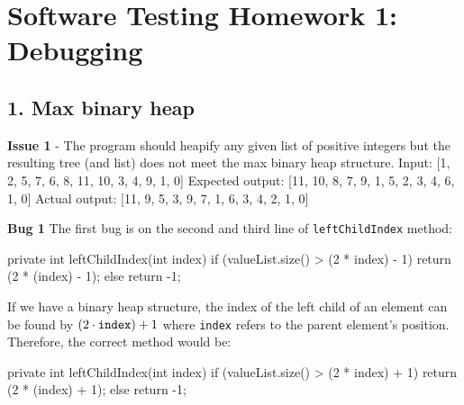 \documentclass[11pt]{article}
\begin{document}
\pagestyle{fancy}

\section*{Software Testing Homework 1: Debugging}

\subsection*{1. Max binary heap}
\newline
\textbf{Issue 1} - The program should heapify any given list of positive integers but the resulting tree (and list) does not meet the max binary heap structure.
\newline
Input: [1, 2, 5, 7, 6, 8, 11, 10, 3, 4, 9, 1, 0]
\newline
Expected output: [11, 10, 8, 7, 9, 1, 5, 2, 3, 4, 6, 1, 0]
\newline
Actual output: [11, 9, 5, 3, 9, 7, 1, 6, 3, 4, 2, 1, 0]

\hfill\begin{minipage}{\dimexpr\textwidth-0.5cm}
\textbf{Bug 1}
\newline
The first bug is on the second and third line of \verb/leftChildIndex/ method:
\begin{javacode}
    private int leftChildIndex(int index) {
        if (valueList.size() > (2 * index) - 1) {
            return (2 * (index) - 1);
        } else return -1;
    }
\end{javacode}
If we have a binary heap structure, the index of the left child of an element can be found by $(2 \cdot \verb/index/) + 1$ where \verb/index/ refers to the parent element's position. Therefore, the correct method would be:
\begin{javacode}
    private int leftChildIndex(int index) {
        if (valueList.size() > (2 * index) + 1) {
            return (2 * (index) + 1);
        } else return -1;
    }
\end{javacode}
\end{minipage}
\end{document}
